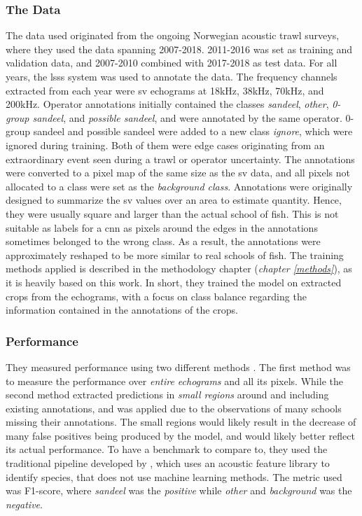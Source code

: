     \subsubsection{The Data}
    The data used originated from the ongoing Norwegian acoustic trawl surveys, where they used the data spanning 2007-2018. 2011-2016 was set as training and validation data, and 2007-2010 combined with 2017-2018 as test data. For all years, the \gls{lsss} system was used to annotate the data. The frequency channels extracted from each year were \gls{sv} echograms at 18kHz, 38kHz, 70kHz, and 200kHz. Operator annotations initially contained the classes \textit{sandeel}, \textit{other}, \textit{0-group sandeel}, and \textit{possible sandeel}, and were annotated by the same operator. 0-group sandeel and possible sandeel were added to a new class \textit{ignore}, which were ignored during training. Both of them were edge cases originating from an extraordinary event seen during a trawl or operator uncertainty. The annotations were converted to a pixel map of the same size as the \gls{sv} data, and all pixels not allocated to a class were set as the \textit{background class}. Annotations were originally designed to summarize the \gls{sv} values over an area to estimate quantity. Hence, they were usually square and larger than the actual school of fish. This is not suitable as labels for a \gls{cnn} as pixels around the edges in the annotations sometimes belonged to the wrong class. As a result, the annotations were approximately reshaped to be more similar to real schools of fish. The training methods applied is described in the methodology chapter (\textit{chapter \ref{methods}}), as it is heavily based on this work.  In short, they trained the model on extracted crops from the echograms, with a focus on class balance regarding the information contained in the annotations of the crops\cite{brautaset2020acoustic}.
    
    \subsubsection{Performance}
    They measured performance using two different methods \cite{brautaset2020acoustic}. The first method was to measure the performance over \textit{entire echograms} and all its pixels. While the second method extracted predictions in \textit{small regions} around and including existing annotations, and was applied due to  the observations of many schools missing their annotations. The small regions would likely result in the decrease of many false positives being produced by the model, and would likely better reflect its actual performance. To have a benchmark to compare to, they used the traditional pipeline developed by \citet{korneliussen2016acoustic}, which uses an acoustic feature library to identify species, that does not use machine learning methods. The metric used was F1-score, where \textit{sandeel} was the \textit{positive}   while \textit{other} and \textit{background} was the \textit{negative}. 
    
